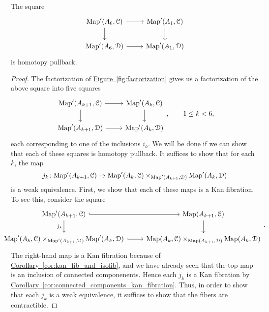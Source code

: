 \documentclass[main.tex]{subfiles}
\begin{document}
\begin{lemma}
  \label{lemma:homotopy_pullback_for_filling_procedure}
  The square
  \begin{equation*}
    \begin{tikzcd}
      \Fun'(A_{6}, \category{C})
      \arrow[r]
      \arrow[d]
      & \Fun'(A_{1}, \category{C})
      \arrow[d]
      \\
      \Fun'(A_{6}, \category{D})
      \arrow[r]
      & \Fun'(A_{1}, \category{D})
    \end{tikzcd}
  \end{equation*}
  is homotopy pullback.
\end{lemma}
\begin{proof}
  The factorization of \hyperref[fig:factorization]{Figure~\ref*{fig:factorization}} gives us a factorization of the above square into five squares
  \begin{equation*}
    \begin{tikzcd}
      \Fun'(A_{k+1}, \category{C})
      \arrow[r]
      \arrow[d]
      & \Fun'(A_{k}, \category{C})
      \arrow[d]
      \\
      \Fun'(A_{k+1}, \category{D})
      \arrow[r]
      & \Fun'(A_{k}, \category{D})
    \end{tikzcd},
    \qquad1 \leq k < 6,
  \end{equation*}
  each corresponding to one of the inclusions $i_{k}$. We will be done if we can show that each of these squares is homotopy pullback. It suffices to show that for each $k$, the map
  \begin{equation*}
    j_{k}\colon \mathrm{Map}'(A_{k+1}, \mathcal{C})
    \to
    \mathrm{Map}'(A_{k}, \mathcal{C})
    \times_{\mathrm{Map}'(A_{k+1}, \mathcal{D})}
    \mathrm{Map}'(A_{k}, \mathcal{D})
  \end{equation*}
  is a weak equivalence. First, we show that each of these maps is a Kan fibration. To see this, consider the square
  \begin{equation*}
    \noindent\makebox[\textwidth]{%
      \begin{tikzcd}[ampersand replacement=\&]
        \Fun'(A_{k+1}, \category{C})
        \arrow[r, hook]
        \arrow[d, swap, "j_{k}"]
        \& \Fun(A_{k+1}, \category{C})
        \arrow[d]
        \\
        \Fun'(A_{k}, \category{C})
        \times_{\Fun'(A_{k+1}, \category{D})}
        \Fun'(A_{k}, \category{D})
        \arrow[r, hook]
        \& \Fun(A_{k}, \category{C})
        \times_{\Fun(A_{k+1}, \category{D})}
        \Fun(A_{k}, \category{D})
      \end{tikzcd}.
    }
  \end{equation*}
  The right-hand map is a Kan fibration because of \hyperref[cor:kan_fib_and_isofib]{Corollary~\ref*{cor:kan_fib_and_isofib}}, and we have already seen that the top map is an inclusion of connected componenents. Hence each $j_{k}$ is a Kan fibration by \hyperref[cor:connected_components_kan_fibration]{Corollary~\ref*{cor:connected_components_kan_fibration}}. Thus, in order to show that each $j_{k}$ is a weak equivalence, it suffices to show that the fibers are contractible.


\end{proof}
\end{document}
